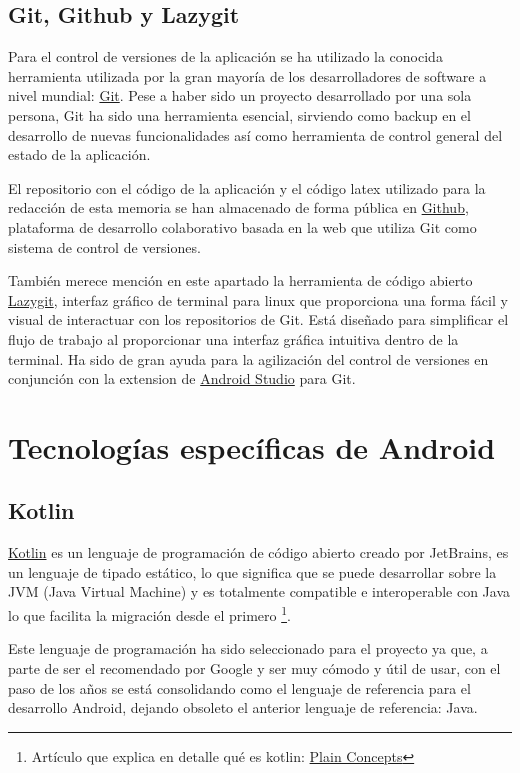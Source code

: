 \subsection{Git, Github y Lazygit}
Para el control de versiones de la aplicación se ha utilizado la conocida herramienta utilizada por la gran mayoría de los desarrolladores de software a nivel mundial: \href{https://git-scm.com/}{Git}. Pese a haber sido un proyecto desarrollado por una sola persona, Git ha sido una herramienta esencial, sirviendo como backup en el desarrollo de nuevas funcionalidades así como herramienta de control general del estado de la aplicación. 

El repositorio con el código de la aplicación y el código latex utilizado para la redacción de esta memoria se han almacenado de forma pública en \href{https://github.com/}{Github}, plataforma de desarrollo colaborativo basada en la web que utiliza Git como sistema de control de versiones.

También merece mención en este apartado la herramienta de código abierto \href{https://github.com/jesseduffield/lazygit}{Lazygit}, interfaz gráfico de terminal para linux que proporciona una forma fácil y visual de interactuar con los repositorios de Git. Está diseñado para simplificar el flujo de trabajo al proporcionar una interfaz gráfica intuitiva dentro de la terminal. Ha sido de gran ayuda para la agilización del control de versiones en conjunción con la extension de \hyperlink{subsec:android_studio}{Android Studio} para Git.
\section{Tecnologías específicas de Android}

\hypertarget{subsec:kotlin}{}
\subsection{Kotlin}
\href{https://kotlinlang.org/}{Kotlin} es un lenguaje de programación de código abierto creado por JetBrains, es un lenguaje de tipado estático, lo que significa que se puede desarrollar sobre la JVM (Java Virtual Machine) y es totalmente compatible e interoperable con Java lo que facilita la migración desde el primero \footnote{Artículo que explica en detalle qué es kotlin: \href{https://www.plainconcepts.com/es/kotlin-android/}{Plain Concepts}}. 

Este lenguaje de programación ha sido seleccionado para el proyecto ya que, a parte de ser el recomendado por Google y ser muy cómodo y útil de usar, con el paso de los años se está consolidando como el lenguaje de referencia para el desarrollo Android, dejando obsoleto el anterior lenguaje de referencia: Java.
